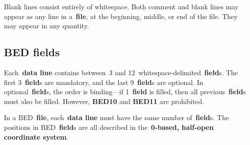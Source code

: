 \documentclass[11pt]{article}
\begin{document}
Blank lines consist entirely of whitespace.
Both comment and blank lines may appear as any line in a~\textbf{file}, at the beginning, middle, or end of the file.
They may appear in any quantity.

\subsection{\acs{BED} fields}

Each~\textbf{data line} contains between~3 and 12~whitespace-delimited~\textbf{field}s.
The first 3~\textbf{field}s are mandatory, and the last 9~\textbf{field}s are optional.
In optional~\textbf{field}s, the order is binding---if 1~\textbf{field} is filled, then all previous~\textbf{field}s must also be filled.
However, \textbf{BED10} and \textbf{BED11} are prohibited.

In a \ac{BED}~\textbf{file}, each~\textbf{data line} must have the same number of~\textbf{field}s.
The positions in \ac{BED}~\textbf{field}s are all described in the~\textbf{0-based, half-open coordinate system}.
\end{document}
